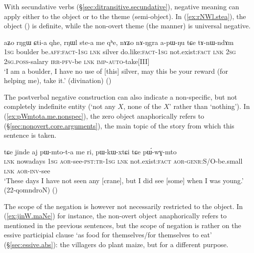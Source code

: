 With secundative verbs (§\ref{sec:ditransitive.secundative}), negative meaning can apply either to the object or to the theme (semi-object). In (\ref{ex:rNWl.stea}), the object () is definite, while the non-overt theme (the manner) is universal negative.


\begin{exe}
\ex \label{ex:rNWl.stea}
\gll aʑo rŋgɯ ɕti-a qhe, rŋɯl ste-a me qʰe, nɤʑo nɤ-ŋgra a-pɯ-ŋu tɕe tɤ-nɯ-ndɤm \\
\textsc{1sg} boulder be.\textsc{aff}:\textsc{fact}-\textsc{1sg} \textsc{lnk} silver do.like:\textsc{fact}-\textsc{1sg} not.exist:\textsc{fact} \textsc{lnk} \textsc{2sg} \textsc{2sg}.\textsc{poss}-salary \textsc{irr}-\textsc{pfv}-be \textsc{lnk} \textsc{imp}-\textsc{auto}-take[III] \\
\glt `I am a boulder, I have no use of [this] silver, may this be your reward (for helping me), take it.' (divination)
()
\end{exe}

The postverbal negative construction can also indicate a non-specific, but not completely indefinite entity (`not any $X$, none of the $X$' rather than `nothing'). In (\ref{ex:pWmtota.me.nonspec}), the zero object anaphorically refers to  (§\ref{sec:nonovert.core.arguments}), the main topic of the story from which this sentence is taken.

\begin{exe}
\ex \label{ex:pWmtota.me.nonspec}
\gll tɕe jinde aj pɯ-mto-t-a me ri, pɯ-kɯ-xtɕi tɕe pɯ́-wɣ-mto \\
\textsc{lnk} nowadays \textsc{1sg} \textsc{aor}-see-\textsc{pst}:\textsc{tr}-\textsc{1sg} \textsc{lnk} not.exist:\textsc{fact} \textsc{aor}-\textsc{genr}:S/O-be.small \textsc{lnk} \textsc{aor}-\textsc{inv}-see \\
\glt `These days I have not seen any [crane], but I did see [some] when I was young.' (22-qomndroN)
()
\end{exe}

The scope of the negation is however not necessarily restricted to the object. In (\ref{ex:jinW.maNe}) for instance, the non-overt object anaphorically refers to  mentioned in the previous sentences, but the scope of negation is rather on the essive participial clause  `as food for themselves/for themselves to eat' (§\ref{sec:essive.abs}): the villagers do  plant maize, but for a different purpose.
 

